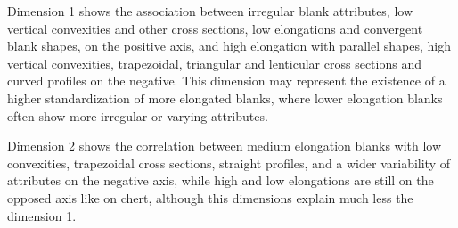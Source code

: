 \documentclass[12pt,twoside]{reedthesis}
\begin{document}
Dimension 1 shows the association between irregular blank attributes, low vertical convexities and other cross sections, low elongations and convergent blank shapes, on the positive axis, and high elongation with parallel shapes, high vertical convexities, trapezoidal, triangular and lenticular cross sections and curved profiles on the negative. This dimension may represent the existence of a higher standardization of more elongated blanks, where lower elongation blanks often show more irregular or varying attributes.

Dimension 2 shows the correlation between medium elongation blanks with low convexities, trapezoidal cross sections, straight profiles, and a wider variability of attributes on the negative axis, while high and low elongations are still on the opposed axis like on chert, although this dimensions explain much less the dimension 1.
\end{document}
